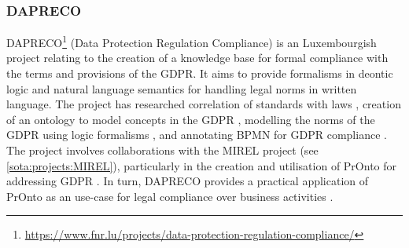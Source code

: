 \subsubsection{DAPRECO}\label{sec:sota:DAPRECO}
DAPRECO\footnote{\url{https://www.fnr.lu/projects/data-protection-regulation-compliance/}} (Data Protection Regulation Compliance) is an Luxembourgish project relating to the creation of a knowledge base for formal compliance with the terms and provisions of the GDPR. It aims to provide formalisms in deontic logic and natural language semantics for handling legal norms in written language. The project has researched correlation of standards with laws \cite{bartolini_towards_2016}, creation of an ontology to model concepts in the GDPR \cite{otake_using_2017}, modelling the norms of the GDPR using logic formalisms \cite{bartolini_legal_2018}, and annotating BPMN for GDPR compliance \cite{bartolini_enhancing_2019}.
The project involves collaborations with the MIREL project (see \autoref{sota:projects:MIREL}), particularly in the creation and utilisation of PrOnto for addressing GDPR \cite{monica_legal_2018,palmirani_pronto:_2018,palmirani_pronto:_2018-1,bartolini_enhancing_2019}. In turn, DAPRECO provides a practical application of PrOnto as an use-case for legal compliance over business activities \cite{bartolini_enhancing_2019,bartolini_agile_2019}.

